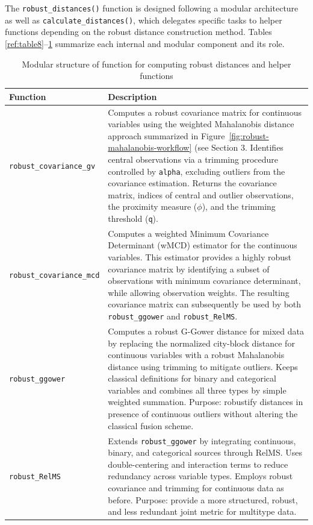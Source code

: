The \texttt{robust\_distances()} function is designed following a modular architecture as well as \texttt{calculate\_distances()}, which delegates specific tasks to helper functions depending on the robust distance construction method. Tables \ref{ref:table8}--\ref{tab:robust-functions} summarize each internal and modular component and its role.

\begin{table}[h!]
\caption{Modular structure of function for computing robust distances and helper functions}
\label{tab:robust-functions}
\begin{center}
{\footnotesize
\begin{tabular}{|p{3.5cm}|p{10.2cm}|}
\hline
\textbf{Function} & \textbf{Description} \\
\hline
\texttt{robust\_covariance\_gv} & Computes a robust covariance matrix for continuous variables using the weighted Mahalanobis distance approach summarized in Figure~\ref{fig:robust-mahalanobis-workflow} (see Section 3.
Identifies central observations via a trimming procedure controlled by \texttt{alpha}, excluding outliers from the covariance estimation. Returns the covariance matrix, indices of central and outlier observations, the proximity measure ($\phi$), and the trimming threshold (\texttt{q}). \\
\hline
\texttt{robust\_covariance\_mcd} &
Computes a weighted Minimum Covariance Determinant (wMCD) estimator for the continuous variables. This estimator provides a highly robust covariance matrix by identifying a subset of observations with minimum covariance determinant, while allowing observation weights. The resulting covariance matrix can subsequently be used by both \texttt{robust\_ggower} and \texttt{robust\_RelMS}. \\
\hline
\texttt{robust\_ggower} & Computes a robust G-Gower distance for mixed data by replacing the normalized city-block distance for continuous variables with a robust Mahalanobis distance using trimming to mitigate outliers. Keeps classical definitions for binary and categorical variables and combines all three types by simple weighted summation. Purpose: robustify distances in presence of continuous outliers without altering the classical fusion scheme. \\
\hline
\texttt{robust\_RelMS} & Extends \texttt{robust\_ggower} by integrating continuous, binary, and categorical sources through RelMS. Uses double-centering and interaction terms to reduce redundancy across variable types. Employs robust covariance and trimming for continuous data as before. Purpose: provide a more structured, robust, and less redundant joint metric for multitype data. \\
\hline
\end{tabular}}
\end{center}
\end{table}


